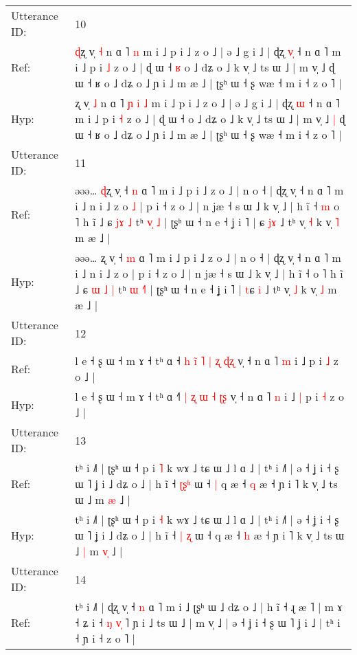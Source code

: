 \documentclass[10pt]{article}
\DeclareRobustCommand{\hl}[1]{{\textcolor{red}{#1}}}
\begin{document}
\begin{longtable}{ll}
 \\
\midrule
Utterance ID: & 10 \\
Ref: & \hl{ɖ}ʐ v̩ \hl{˧} n ɑ ˥\hl{}\hl{}\hl{}\hl{} \hl{n} m i ˩ p i ˩ z o ˩ | ə ˩ g i ˩ | ɖʐ \hl{v}\hl{̩} ˧ n ɑ ˥ m i ˩ p i \hl{˩} z o ˩ | ɖ ɯ ˧\hl{ }\hl{ʁ} o ˩ dʑ o ˩ k v̩ ˩ ts ɯ ˩ | m v̩ ˩\hl{}\hl{} ɖ ɯ ˧ ʁ o ˩ dʑ o ˩ ɲ i ˩ m æ ˩ | ʈʂʰ ɯ ˧ ʂ wæ ˧ m i ˧ z o ˥ |
 \\
Hyp: & \hl{}ʐ v̩ \hl{˩} n ɑ ˥\hl{ }\hl{ɲ}\hl{ }\hl{i} \hl{˩} m i ˩ p i ˩ z o ˩ | ə ˩ g i ˩ | ɖʐ \hl{}\hl{ɯ} ˧ n ɑ ˥ m i ˩ p i \hl{˧} z o ˩ | ɖ ɯ ˧\hl{}\hl{} o ˩ dʑ o ˩ k v̩ ˩ ts ɯ ˩ | m v̩ ˩\hl{ }\hl{|} ɖ ɯ ˧ ʁ o ˩ dʑ o ˩ ɲ i ˩ m æ ˩ | ʈʂʰ ɯ ˧ ʂ wæ ˧ m i ˧ z o ˥ |
 \\
\midrule
Utterance ID: & 11 \\
Ref: & əəə… \hl{ɖ}ʐ v̩ ˧ \hl{n} ɑ ˥ m i ˩ p i ˩ z o ˩ | n o ˧ | ɖʐ v̩ ˧ n ɑ ˥ m i ˩ n i ˩ z o\hl{ }\hl{˩} | p i ˧ z o ˩ | n jæ ˧ s ɯ ˩ k v̩ ˩ | h ĩ ˧\hl{ }\hl{m} o ˥ h ĩ ˩ ɕ \hl{}\hl{j}\hl{ɤ} \hl{˩} tʰ \hl{v}\hl{̩}\hl{ }\hl{˩} | ʈʂʰ ɯ ˧ n e ˧ ʝ i ˥ | \hl{}ɕ \hl{j}\hl{ɤ} ˩ tʰ v̩ \hl{˧} k v̩ \hl{˥} m æ ˩ |
 \\
Hyp: & əəə… \hl{}ʐ v̩ ˧ \hl{m} ɑ ˥ m i ˩ p i ˩ z o ˩ | n o ˧ | ɖʐ v̩ ˧ n ɑ ˥ m i ˩ n i ˩ z o\hl{}\hl{} | p i ˧ z o ˩ | n jæ ˧ s ɯ ˩ k v̩ ˩ | h ĩ ˧\hl{}\hl{} o ˥ h ĩ ˩ ɕ \hl{ɯ}\hl{ }\hl{˩} \hl{|} tʰ \hl{ɯ}\hl{ }\hl{˧}\hl{˥} | ʈʂʰ ɯ ˧ n e ˧ ʝ i ˥ | \hl{t}ɕ \hl{}\hl{i} ˩ tʰ v̩ \hl{˩} k v̩ \hl{˩} m æ ˩ |
 \\
\midrule
Utterance ID: & 12 \\
Ref: & l e ˧ ʂ ɯ ˧ m ɤ ˧ tʰ ɑ ˧\hl{ }\hl{h} \hl{i}\hl{̃} \hl{˥} \hl{|} \hl{ʐ} \hl{ɖ}\hl{ʐ} v̩ ˧ n ɑ ˥ \hl{m} i ˩\hl{}\hl{} p i \hl{˩} z o ˩ |
 \\
Hyp: & l e ˧ ʂ ɯ ˧ m ɤ ˧ tʰ ɑ ˧\hl{}\hl{˥} \hl{}\hl{|} \hl{ʐ} \hl{ɯ} \hl{˧} \hl{ʈ}\hl{ʂ} v̩ ˧ n ɑ ˥ \hl{n} i ˩\hl{ }\hl{|} p i \hl{˧} z o ˩ |
 \\
\midrule
Utterance ID: & 13 \\
Ref: & tʰ i ˩˥ | ʈʂʰ ɯ ˧ p i \hl{˥} k wɤ ˩ tɕ ɯ ˩ l ɑ ˩ | tʰ i ˩˥ | ə ˧ ʝ i ˧ ʂ ɯ ˥ ʝ i ˩ dʑ o ˩ | h ĩ ˧ \hl{ʈ}\hl{ʂ}\hl{ʰ} ɯ ˧\hl{ }\hl{|} q æ ˧ \hl{q} æ ˧ ɲ i ˥ k v̩ ˩ ts ɯ ˩\hl{}\hl{} m \hl{}\hl{æ} ˩ |
 \\
Hyp: & tʰ i ˩˥ | ʈʂʰ ɯ ˧ p i \hl{˧} k wɤ ˩ tɕ ɯ ˩ l ɑ ˩ | tʰ i ˩˥ | ə ˧ ʝ i ˧ ʂ ɯ ˥ ʝ i ˩ dʑ o ˩ | h ĩ ˧ \hl{|}\hl{ }\hl{ʐ} ɯ ˧\hl{}\hl{} q æ ˧ \hl{h} æ ˧ ɲ i ˥ k v̩ ˩ ts ɯ ˩\hl{ }\hl{|} m \hl{v}\hl{̩} ˩ |
 \\
\midrule
Utterance ID: & 14 \\
Ref: & tʰ i ˩˥ | ɖʐ v̩ ˧\hl{ }\hl{n} ɑ ˥ m i ˩\hl{}\hl{} ʈʂʰ ɯ ˩ dʑ o ˩ | h ĩ ˧ ɻ æ ˥ | m ɤ ˧ ʑ i ˧ \hl{ŋ} \hl{v}\hl{̩} ˥ ɲ i ˩ ts ɯ ˩ | m v̩ ˩ | ə ˧ ʝ i ˧ ʂ ɯ ˥ ʝ i ˩ | tʰ i ˧ ɲ i ˧ z o ˥ |

\end{longtable}
\end{document}
